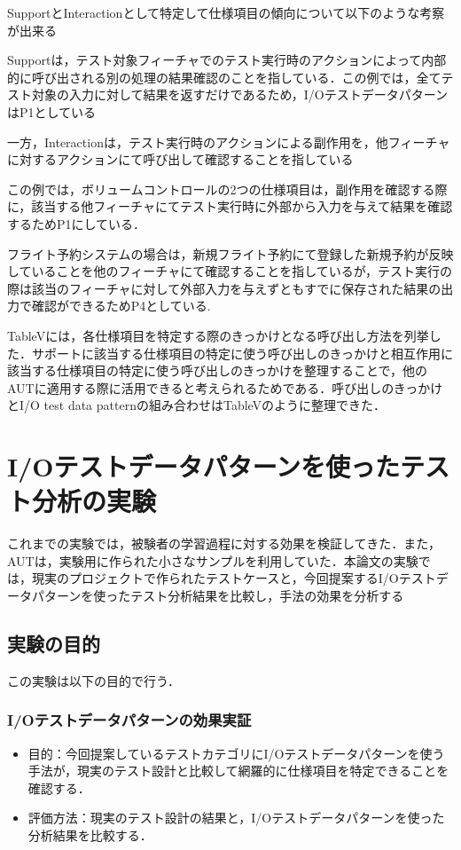 \documentclass[a4paper,12pt]{jreport}
\begin{document}
SupportとInteractionとして特定して仕様項目の傾向について以下のような考察が出来る

Supportは，テスト対象フィーチャでのテスト実行時のアクションによって内部的に呼び出される別の処理の結果確認のことを指している．この例では，全てテスト対象の入力に対して結果を返すだけであるため，I/OテストデータパターンはP1としている


一方，Interactionは，テスト実行時のアクションによる副作用を，他フィーチャに対するアクションにて呼び出して確認することを指している

この例では，ボリュームコントロールの2つの仕様項目は，副作用を確認する際に，該当する他フィーチャにてテスト実行時に外部から入力を与えて結果を確認するためP1にしている．

フライト予約システムの場合は，新規フライト予約にて登録した新規予約が反映していることを他のフィーチャにて確認することを指しているが，テスト実行の際は該当のフィーチャに対して外部入力を与えずともすでに保存された結果の出力で確認ができるためP4としている.

TableVには，各仕様項目を特定する際のきっかけとなる呼び出し方法を列挙した．サポートに該当する仕様項目の特定に使う呼び出しのきっかけと相互作用に該当する仕様項目の特定に使う呼び出しのきっかけを整理することで，他のAUTに適用する際に活用できると考えられるためである．呼び出しのきっかけとI/O test data patternの組み合わせはTableVのように整理できた．

\section{I/Oテストデータパターンを使ったテスト分析の実験}
これまでの実験では，被験者の学習過程に対する効果を検証してきた．また，AUTは，実験用に作られた小さなサンプルを利用していた．本論文の実験では，現実のプロジェクトで作られたテストケースと，今回提案するI/Oテストデータパターンを使ったテスト分析結果を比較し，手法の効果を分析する

\subsection{実験の目的}
この実験は以下の目的で行う．

\subsubsection{I/Oテストデータパターンの効果実証}
\begin{itemize}
\item 目的：今回提案しているテストカテゴリにI/Oテストデータパターンを使う手法が，現実のテスト設計と比較して網羅的に仕様項目を特定できることを確認する．
\item 評価方法：現実のテスト設計の結果と，I/Oテストデータパターンを使った分析結果を比較する．
\end{itemize}
\end{document}
